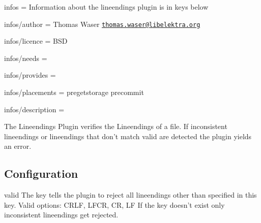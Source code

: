 
\begin{DoxyItemize}
\item infos = Information about the lineendings plugin is in keys below
\item infos/author = Thomas Waser \href{mailto:thomas.waser@libelektra.org}{\tt thomas.\+waser@libelektra.\+org}
\item infos/licence = B\+S\+D
\item infos/needs =
\item infos/provides =
\item infos/placements = pregetstorage precommit
\item infos/description =
\end{DoxyItemize}

The Lineendings Plugin verifies the Lineendings of a file. If inconsistent lineendings or lineendings that don't match {\ttfamily valid} are detected the plugin yields an error.

\subsection*{Configuration}

{\ttfamily valid} The key tells the plugin to reject all lineendings other than specified in this key. Valid options\+: C\+R\+L\+F, L\+F\+C\+R, C\+R, L\+F If the key doesn't exist only inconsistent lineendings get rejected. 